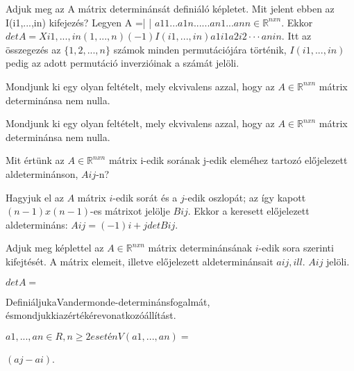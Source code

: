 \begin{frame}
  \begin{tcolorbox}[title={23}]
   Adjuk meg az A mátrix determinánsát definiáló képletet. Mit jelent ebben az I(i1,...,in) kifejezés? 
  \tcblower
Legyen A =| |
$a11 ... a1n . . . . . . an1 ... ann \in \mathbb{R}^{n x n}$. Ekkor $detA = X i1,...,in (1,...,n)
(-1)I(i1,...,in)a1i1a2i2  \cdot  \cdot  \cdot anin$.
Itt az összegezés az $\{1,2,...,n\}$ számok minden permutációjára történik, $I(i1,...,in)$ pedig az adott permutáció inverzióinak a számát jelöli.

  \end{tcolorbox}
\end{frame}


\begin{frame}
  \begin{tcolorbox}[title={24}]
   Mondjunk ki egy olyan feltételt, mely ekvivalens azzal, hogy az $A \in \mathbb{R}^{n x n}$ mátrix determinánsa nem nulla.

  \tcblower
Mondjunk ki egy olyan feltételt, mely ekvivalens azzal, hogy az $A \in \mathbb{R}^{n x n}$ mátrix determinánsa nem nulla.

  \end{tcolorbox}
\end{frame}


\begin{frame}
  \begin{tcolorbox}[title={25}]
   Mit értünk az $A \in \mathbb{R}^{n x n}$ mátrix i-edik sorának j-edik eleméhez tartozó előjelezett aldeterminánson, $Aij$-n?

  \tcblower
Hagyjuk el az $A$ mátrix $i$-edik sorát és a $j$-edik oszlopát; az így kapott $(n-1)x(n-1)$-es mátrixot jelölje $Bij$. Ekkor a keresett előjelezett aldetermináns: $Aij = (-1)i+j detBij$.

  \end{tcolorbox}
\end{frame}

\begin{frame}
  \begin{tcolorbox}[title={26}]
   Adjuk meg képlettel az $A \in \mathbb{R}^{n x n}$ mátrix determinánsának $i$-edik sora szerinti kifejtését. A mátrix elemeit, illetve előjelezett aldeterminánsait $aij, ill$. $Aij$ jelöli.

  \tcblower
$detA =$
  \end{tcolorbox}
\end{frame}


\begin{frame}
  \begin{tcolorbox}[title={28}]
    DefiniáljukaVandermonde-determinánsfogalmát, ésmondjukkiazértékérevonatkozóállítást.

  \tcblower
$a1,...,an \in R, n \geq 2 esetén V (a1,...,an) =$



$(aj - ai)$.

  \end{tcolorbox}
\end{frame}


